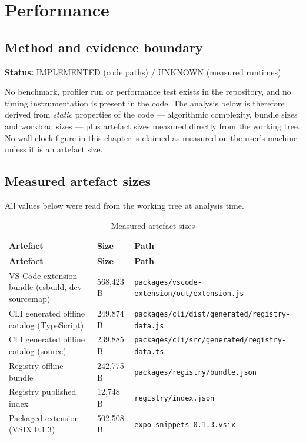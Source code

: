 \chapter{Performance}
\label{ch:performance}

\section{Method and evidence boundary}

\textbf{Status:} IMPLEMENTED (code paths) / UNKNOWN (measured runtimes).

No benchmark, profiler run or performance test exists in the repository, and no
timing instrumentation is present in the code. The analysis below is therefore
derived from \emph{static} properties of the code --- algorithmic complexity,
bundle sizes and workload sizes --- plus artefact sizes measured directly from
the working tree. No wall-clock figure in this chapter is claimed as measured on
the user's machine unless it is an artefact size.

\section{Measured artefact sizes}

All values below were read from the working tree at analysis time.

\begin{longtable}{@{}L{7.4cm}L{2.6cm}L{3.8cm}@{}}
\caption{Measured artefact sizes}\\
\toprule
\textbf{Artefact} & \textbf{Size} & \textbf{Path} \\
\midrule
\endfirsthead
\toprule
\textbf{Artefact} & \textbf{Size} & \textbf{Path} \\
\midrule
\endhead
VS Code extension bundle (esbuild, dev sourcemap) & 568{,}423 B & \texttt{packages/vscode-extension/out/extension.js} \\
CLI generated offline catalog (TypeScript) & 249{,}874 B & \texttt{packages/cli/dist/generated/registry-data.js} \\
CLI generated offline catalog (source) & 239{,}885 B & \texttt{packages/cli/src/generated/registry-data.ts} \\
Registry offline bundle & 242{,}775 B & \texttt{packages/registry/bundle.json} \\
Registry published index & 12{,}748 B & \texttt{registry/index.json} \\
Packaged extension (VSIX 0.1.3) & 502{,}508 B & \texttt{expo-snippets-0.1.3.vsix} \\
\bottomrule
\end{longtable}


